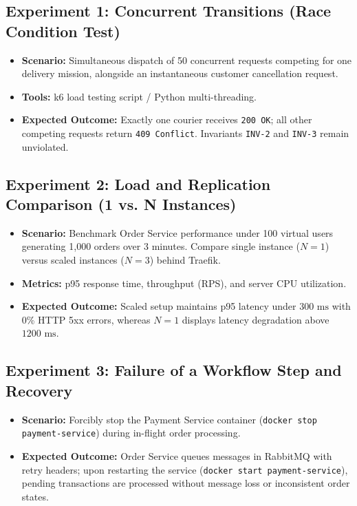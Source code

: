 \documentclass[11pt,a4paper]{article}
\begin{document}
\subsection{Experiment 1: Concurrent Transitions (Race Condition Test)}
\begin{itemize}[noitemsep]
    \item \textbf{Scenario:} Simultaneous dispatch of 50 concurrent requests competing for one delivery mission, alongside an instantaneous customer cancellation request.
    \item \textbf{Tools:} k6 load testing script / Python multi-threading.
    \item \textbf{Expected Outcome:} Exactly one courier receives \texttt{200 OK}; all other competing requests return \texttt{409 Conflict}. Invariants \texttt{INV-2} and \texttt{INV-3} remain unviolated.
\end{itemize}

\subsection{Experiment 2: Load and Replication Comparison (1 vs. N Instances)}
\begin{itemize}[noitemsep]
    \item \textbf{Scenario:} Benchmark Order Service performance under 100 virtual users generating 1,000 orders over 3 minutes. Compare single instance ($N=1$) versus scaled instances ($N=3$) behind Traefik.
    \item \textbf{Metrics:} p95 response time, throughput (RPS), and server CPU utilization.
    \item \textbf{Expected Outcome:} Scaled setup maintains p95 latency under $300\text{ ms}$ with 0\% HTTP 5xx errors, whereas $N=1$ displays latency degradation above $1200\text{ ms}$.
\end{itemize}

\subsection{Experiment 3: Failure of a Workflow Step and Recovery}
\begin{itemize}[noitemsep]
    \item \textbf{Scenario:} Forcibly stop the Payment Service container (\texttt{docker stop payment-service}) during in-flight order processing.
    \item \textbf{Expected Outcome:} Order Service queues messages in RabbitMQ with retry headers; upon restarting the service (\texttt{docker start payment-service}), pending transactions are processed without message loss or inconsistent order states.
\end{itemize}
\end{document}
